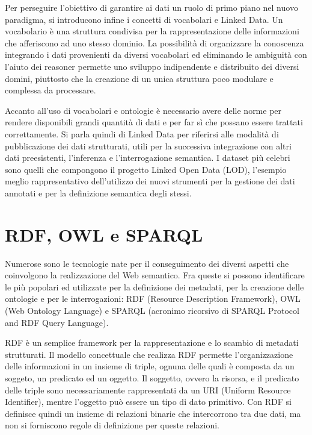 \documentclass[Lau,binding=0.6cm,noexaminfo]{sapthesis}
\begin{document}
Per perseguire l'obiettivo di garantire ai dati un ruolo di primo piano nel nuovo paradigma, si introducono infine i concetti di vocabolari e Linked Data. Un vocabolario è una struttura condivisa per la rappresentazione delle informazioni che afferiscono ad uno stesso dominio.
La possibilità di organizzare la conoscenza integrando i dati provenienti da diversi vocabolari ed eliminando le ambiguità con l'aiuto dei reasoner permette uno sviluppo indipendente e distribuito dei diversi domini, piuttosto che la creazione di un unica struttura poco modulare e complessa da processare.\medskip

Accanto all'uso di vocabolari e ontologie è necessario avere delle norme per rendere disponibili grandi quantità di dati e per far sì che possano essere trattati correttamente. Si parla quindi di Linked Data per riferirsi alle modalità di pubblicazione dei dati strutturati, utili per la successiva integrazione con altri dati preesistenti, l'inferenza e l'interrogazione semantica.
I dataset più celebri sono quelli che compongono il progetto Linked Open Data (LOD), l'esempio meglio rappresentativo dell'utilizzo dei nuovi strumenti per la gestione dei dati annotati e per la definizione semantica degli stessi.\medskip

\clearpage

\section{RDF, OWL e SPARQL}

Numerose sono le tecnologie nate per il conseguimento dei diversi aspetti che coinvolgono la realizzazione del Web semantico. Fra queste si possono identificare le più popolari ed utilizzate per la definizione dei metadati, per la creazione delle ontologie e per le interrogazioni: RDF (Resource Description Framework), OWL (Web Ontology Language) e SPARQL (acronimo ricorsivo di SPARQL Protocol and RDF Query Language).\medskip

RDF è un semplice framework per la rappresentazione e lo scambio di metadati strutturati. Il modello concettuale che realizza RDF permette l'organizzazione delle informazioni in un insieme di triple, ognuna delle quali è composta da un soggeto, un predicato ed un oggetto. Il soggetto, ovvero la risorsa, e il predicato delle triple sono necessariamente rappresentati da un URI (Uniform Resource Identifier), mentre l'oggetto può essere un tipo di dato primitivo. Con RDF si definisce quindi un insieme di relazioni binarie che intercorrono tra due dati, ma non si forniscono regole di definizione per queste relazioni.\medskip
\end{document}

